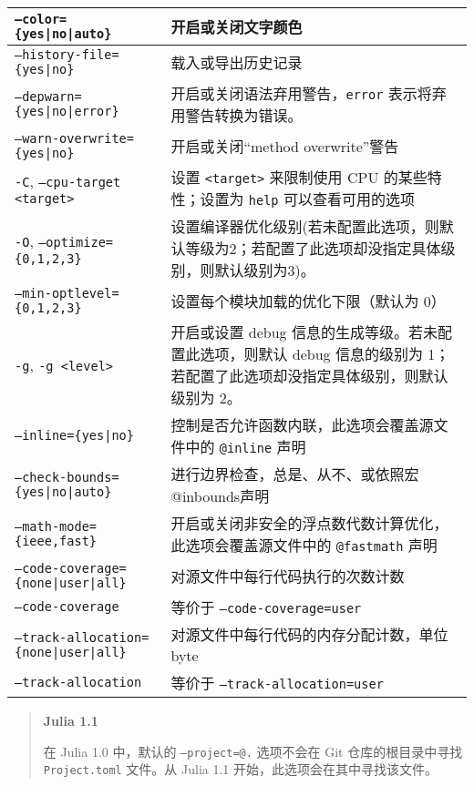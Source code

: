 \begin{table}[h]
\begin{tabulary}{\linewidth}{|L|L|}
\hline
\texttt{--color=\{yes|no|auto\}} & 开启或关闭文字颜色 \\
\hline
\texttt{--history-file=\{yes|no\}} & 载入或导出历史记录 \\
\hline
\texttt{--depwarn=\{yes|no|error\}} & 开启或关闭语法弃用警告，\texttt{error} 表示将弃用警告转换为错误。 \\
\hline
\texttt{--warn-overwrite=\{yes|no\}} & 开启或关闭“method overwrite”警告 \\
\hline
\texttt{-C}, \texttt{--cpu-target <target>} & 设置 \texttt{<target>} 来限制使用 CPU 的某些特性；设置为 \texttt{help} 可以查看可用的选项 \\
\hline
\texttt{-O}, \texttt{--optimize=\{0,1,2,3\}} & 设置编译器优化级别(若未配置此选项，则默认等级为2；若配置了此选项却没指定具体级别，则默认级别为3)。 \\
\hline
\texttt{--min-optlevel=\{0,1,2,3\}} & 设置每个模块加载的优化下限（默认为 0） \\
\hline
\texttt{-g}, \texttt{-g <level>} & 开启或设置 debug 信息的生成等级。若未配置此选项，则默认 debug 信息的级别为 1；若配置了此选项却没指定具体级别，则默认级别为 2。 \\
\hline
\texttt{--inline=\{yes|no\}} & 控制是否允许函数内联，此选项会覆盖源文件中的 \texttt{@inline} 声明 \\
\hline
\texttt{--check-bounds=\{yes|no|auto\}} & 进行边界检查，总是、从不、或依照宏@inbounds声明 \\
\hline
\texttt{--math-mode=\{ieee,fast\}} & 开启或关闭非安全的浮点数代数计算优化，此选项会覆盖源文件中的 \texttt{@fastmath} 声明 \\
\hline
\texttt{--code-coverage=\{none|user|all\}} & 对源文件中每行代码执行的次数计数 \\
\hline
\texttt{--code-coverage} & 等价于 \texttt{--code-coverage=user} \\
\hline
\texttt{--track-allocation=\{none|user|all\}} & 对源文件中每行代码的内存分配计数，单位 byte \\
\hline
\texttt{--track-allocation} & 等价于 \texttt{--track-allocation=user} \\
\hline
\end{tabulary}

\end{table}



\begin{quote}
\textbf{Julia 1.1}

在 Julia 1.0 中，默认的 \texttt{--project=@.} 选项不会在 Git 仓库的根目录中寻找 \texttt{Project.toml} 文件。从 Julia 1.1 开始，此选项会在其中寻找该文件。

\end{quote}
